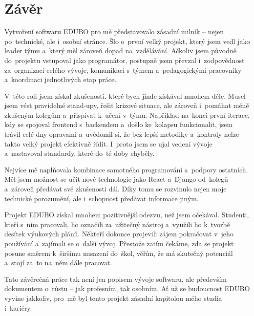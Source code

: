 \documentclass[male,czech,api_bc]{kitheses}
\begin{document}
\chapter{Závěr}

Vytvoření softwaru EDUBO pro mě představovalo zásadní milník – nejen po~technické, ale i~osobní stránce. Šlo o~první velký projekt, který jsem vedl jako leader týmu a~který měl zároveň dopad na~vzdělávání. Ačkoliv jsem původně do~projektu vstupoval jako programátor, postupně jsem převzal i~zodpovědnost za~organizaci celého vývoje, komunikaci s~týmem a~pedagogickými pracovníky a~koordinaci jednotlivých etap práce.

V~této roli jsem získal zkušenosti, které bych jinde získával mnohem déle. Musel jsem vést pravidelné stand-upy, řešit krizové situace, ale zároveň i~pomáhat méně zkušeným kolegům a~přispívat k~učení v~týmu. Například na~konci první iterace, kdy se spojoval frontend s~backendem a~došlo ke~kolapsu funkcionalit, jsem trávil celé dny opravami a~uvědomil si, že bez lepší metodiky a~kontroly nelze takto velký projekt efektivně řídit. I~proto jsem se ujal vedení vývoje a~nastavoval standardy, které do~té doby chyběly.

Nejvíce mě naplňovala kombinace samotného programování a~podpory ostatních. Měl jsem možnost se učit nové technologie jako React a~Django od~kolegů a~zároveň předávat své zkušenosti dál. Díky tomu se rozvinulo nejen moje technické porozumění, ale i~schopnost předávat informace jiným.

Projekt EDUBO získal mnohem pozitivnější odezvu, než jsem očekával. Studenti, kteří s~ním pracovali, ho označili za~užitečný nástroj a~využili ho k~tvorbě desítek výukových plánů. Někteří dokonce projevili zájem pokračovat v~jeho používání a~zajímali se o~další vývoj. Přestože zatím čekáme, zda se projekt posune směrem k~širšímu nasazení do~škol, věřím, že má skutečný potenciál a~stojí za~to na~něm dále pracovat.

Tato závěrečná práce tak není jen popisem vývoje softwaru, ale především dokumentem o~růstu – jak profesním, tak osobním. Ať už se budoucnost EDUBO vyvine jakkoliv, pro~mě byl tento projekt zásadní kapitolou mého studia i~kariéry.
\end{document}
